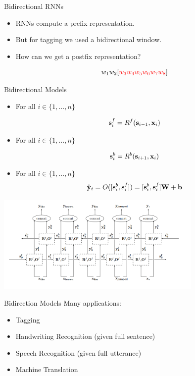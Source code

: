 \documentclass{beamer}
\begin{document}
\begin{frame}{Bidirectional RNNs}
  \begin{itemize}
  \item RNNs compute a prefix representation.
    \air 

  \item But for tagging we used a bidirectional window. 

    \air 

  \item How can we get a postfix representation?

  \[ w_1 w_2 [\textcolor{red}{w_3 w_4 w_5 w_6 w_7 w_8}] \] 

  \end{itemize}

\end{frame}

\begin{frame}{Bidirectional Models}
  \begin{itemize}
    \item For all $i \in \{1, \ldots, n \}$ 

      \[\mathbf{s}^f_{i} = R^{f}(\mathbf{s}_{i-1}, \mathbf{x}_i) \]

    \item For all $i \in \{1, \ldots, n \}$ 

      \[\mathbf{s}^b_{i} = R^{b}(\mathbf{s}_{i+1}, \mathbf{x}_i) \]

    \item For all $i \in \{1, \ldots, n \}$ 
      \[ \hat{\mathbf{y}}_i = O([\mathbf{s}^b_{i}, \mathbf{s}^f_{i}]) = [\mathbf{s}^b_{i}, \mathbf{s}^f_{i}] \mathbf{W} + \mathbf{b} \] 
  \end{itemize}
\end{frame}

\begin{frame}
  \begin{center}
    \includegraphics[width=10cm]{ygbidirection}
  \end{center}
\end{frame}


\begin{frame}{Bidirection Models}
  Many applications:
  \begin{itemize}
  \item Tagging
    \air 

  \item Handwriting Recognition (given full sentence)
    \air

  \item Speech Recognition (given full utterance)
    \air 

  \item Machine Translation 
  \end{itemize}
\end{frame}
\end{document}
